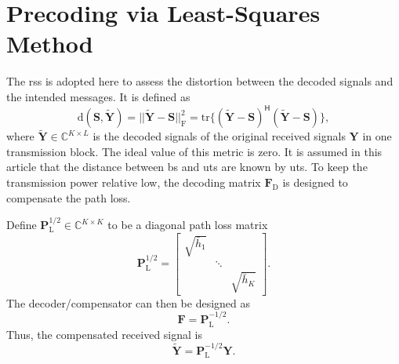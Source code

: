\documentclass[12pt,draftclsnofoot,onecolumn,journal]{IEEEtran}
\begin{document}
\section{Precoding via Least-Squares Method}
The \ac{rss} is adopted here to assess the distortion between the decoded signals and the intended messages. It is defined as
\begin{equation}
\mathrm d(\mathbf S, \tilde{\mathbf Y})=||\tilde{\mathbf Y}-\mathbf S||_{\mathrm{F}}^2=\mathrm{tr}\{(\tilde{\mathbf Y}-\mathbf S)^{\mathsf H}(\tilde{\mathbf Y}-\mathbf S)\},
\label{eq:distancegeneral}
\end{equation}
where $\tilde{\mathbf Y}\in \mathbb C^{K\times L}$ is the decoded signals of the original received signals $\mathbf Y$ in one transmission block.
The ideal value of this metric is zero.
It is assumed in this article that the distance between \ac{bs} and \acp{ut} are known by \acp{ut}. To keep the transmission power relative low, the decoding matrix $\mathbf F_{\mathrm D}$ is designed to compensate the path loss.
 
Define $\mathbf P_{\mathrm L}^{1/2}\in \mathbb C^{K\times K}$ to be a diagonal path loss matrix
\begin{equation}
\mathbf P_{\mathrm L}^{1/2}=
\begin{bmatrix}
\sqrt{\bar h_1} & & \\
&\ddots & \\
& &\sqrt{\bar h_K}
\end{bmatrix}.
\end{equation}
The decoder/compensator can then be designed as 
\begin{equation}
\mathbf F=\mathbf P_{\mathrm L}^{-1/2}.
\end{equation}
Thus, the compensated received signal is
\begin{equation}
\tilde{\mathbf Y}=\mathbf P_{\mathrm L}^{-1/2}\mathbf Y.
\end{equation}
\end{document}
